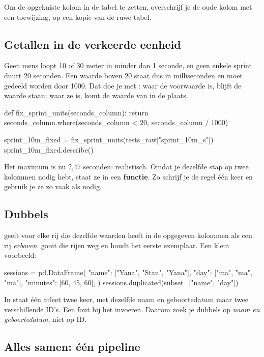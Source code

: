 \documentclass[11pt,a4paper]{article}
\begin{document}
Om de opgekuiste kolom in de tabel te zetten, overschrijf je de oude
kolom met een toewijzing, op een kopie van de ruwe tabel.

\subsection{Getallen in de verkeerde eenheid}

Geen mens loopt 10 of 30 meter in minder dan 1 seconde, en geen enkele
sprint duurt 20 seconden. Een waarde boven 20 staat dus in milliseconden
en moet gedeeld worden door 1000. Dat doe je met
: waar de voorwaarde  is,
blijft de waarde staan; waar ze  is, komt de waarde van
 in de plaats.

\begin{python}
def fix_sprint_units(seconds_column):
    return seconds_column.where(seconds_column < 20, seconds_column / 1000)

sprint_10m_fixed = fix_sprint_units(tests_raw["sprint_10m_s"])
sprint_10m_fixed.describe()
\end{python}

Het maximum is nu 2,47 seconden: realistisch. Omdat je dezelfde stap op
twee kolommen nodig hebt, staat ze in een \textbf{functie}. Zo schrijf je
de regel één keer en gebruik je ze zo vaak als nodig.

\subsection{Dubbels}

 geeft  voor elke rij die
dezelfde waarden heeft in de opgegeven kolommen als een rij
\emph{erboven}. 
gooit die rijen weg en houdt het eerste exemplaar. Een klein voorbeeld:

\begin{python}
sessions = pd.DataFrame({
    "name": ["Yana", "Stan", "Yana"],
    "day": ["ma", "ma", "ma"],
    "minutes": [60, 45, 60],
})
sessions.duplicated(subset=["name", "day"])
\end{python}

In  staat één atleet twee keer, met dezelfde naam en
geboortedatum maar twee verschillende ID's. Een fout bij het invoeren.
Daarom zoek je dubbels op \emph{naam en geboortedatum}, niet op ID.

\subsection{Alles samen: één pipeline}
\end{document}
